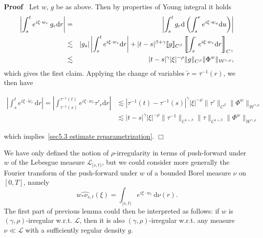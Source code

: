 \documentclass[10pt]{article}
\newcommand{\comma}{{,}}
\newcommand{\mathd}{\mathrm{d}}
\newcommand{\tmcolor}[2]{{\color{#1}{#2}}}
\newenvironment{proof}{\noindent\textbf{Proof\ }}{\hspace*{\fill}$\Box$\medskip}
\begin{document}
\begin{proof}
  Let $w$, $g$ be as above. Then by properties of Young integral it holds
  \begin{eqnarray*}
    \left| \int_s^t e^{i \xi \cdot w_r} \, g_r \mathd r \right| & = & \left|
    \int_s^t g_r \mathd \left( \int_s^r e^{i \xi \cdot w_u} \mathd u \right)
    \right|\\
    & \lesssim & | g_s | \left| \int_s^t e^{i \xi \cdot w_r} \mathd r \right|
    + | t - s |^{\beta + \gamma} \llbracket g \rrbracket_{C^{\beta}}
    \left\llbracket \int_s^{\cdot} e^{i \xi \cdot w_r} \mathd r
    \right\rrbracket_{C^{\gamma}}\\
    & \lesssim & | t - s |^{\gamma} | \xi |^{- \rho} \| g \|_{C^{\beta}}
    \tmcolor{black}{\| \Phi^w \|_{\mathcal{W}^{\gamma \comma \rho}}},
  \end{eqnarray*}
  which gives the first claim. Applying the change of variables $\tilde{r} =
  \tau^{- 1} (r)$, we then have
  
  \begin{align}
    \left| \int_s^t e^{i \xi \cdot \tilde{w}_r} \, \mathd r \right| = \left|
    \int_{\tau^{- 1} (s)}^{\tau^{- 1} (t)} e^{i \xi \cdot w_r} \tau'_r \mathd
    r \right| & \lesssim | \tau^{- 1} (t) - \tau^{- 1} (s) |^{\gamma} | \xi
    |^{- \rho} \| \tau' \|_{C^{\beta}} \| \Phi^w \|_{\mathcal{W}^{\gamma,
    \rho}}\\
    & \lesssim | t - s |^{\gamma} | \xi |^{- \rho} \| \tau^{- 1} \|_{C^{1 +
    \beta}} \| \tau \|_{C^{1 + \beta}} \| \Phi^w \|_{\mathcal{W}^{\gamma
    \comma \rho}}
  \end{align}
  
  which implies~{\eqref{sec5.3 estimate reparametrization}}.
\end{proof}

\begin{remark}
  We have only defined the notion of $\rho$\mbox{-}irregularity in terms of
  push-forward under $w$ of the Lebesgue measure $\mathcal{L}_{[s, t)}$, but
  we could consider more generally the Fourier transform of the push-forward
  under $w$ of a bounded Borel measure $\nu$ on $[0, T]$, namely
  \[ \widehat{w_{\ast} \nu_{s, t}} (\xi) = \int_{[s, t)} e^{i \xi \cdot w_r}
     \, \mathd \nu (r) . \]
  The first part of previous lemma could then be interpreted as follows: if
  $w$ is $(\gamma, \rho)$\mbox{-}irregular w.r.t. $\mathcal{L}$, then it is
  also $(\gamma, \rho)$\mbox{-}irregular w.r.t. any measure $\nu \ll
  \mathcal{L}$ with a sufficiently regular density $g$.
\end{remark}
\end{document}
